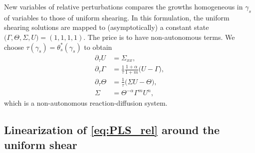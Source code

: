 \documentclass[a4paper,11pt]{article}
\def\blue{\color{blue}}
\theoremstyle{remark}
\begin{document}
{New variables of relative perturbations compares the growths homogeneous in $\gamma_s$ of variables to those of uniform shearing. In this formulation, the uniform shearing solutions are mapped to (asymptotically) a constant state $\big(\Gamma, \Theta,\Sigma,U\big)=(1,1,1,1)$. The price is to have non-autonomous terms. We choose $\tau(\gamma_s) = \theta_s^*(\gamma_s)$ to obtain
\begin{equation} \label{eq:PLS_rel}
 \begin{aligned}
  \partial_\tau U &= \Sigma_{xx},\\
  \partial_\tau \Gamma &= \frac{1}{\tau}\frac{1+\alpha}{1+m} \Big(U-\Gamma\Big),\\
  \partial_\tau \Theta &= \frac{1}{\tau}\Big(\Sigma U - \Theta\Big), \\
  \Sigma&=\Theta^{-\alpha}\Gamma^m U^n,
 \end{aligned}
\end{equation}
which is a non-autonomous reaction-diffusion system.
%
%
%


\subsection{Linearization of \eqref{eq:PLS_rel} around the uniform shear}


}
\end{document}
